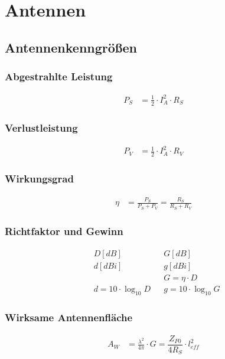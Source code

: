 \section{Antennen}

\subsection{Antennenkenngrößen}



\subsubsection{Abgestrahlte Leistung}
\begin{align*}
    P_S & = \frac{1}{2}\cdot I_A^2 \cdot R_S
\end{align*}

\subsubsection{Verlustleistung}
\begin{align*}
    P_V & = \frac{1}{2}\cdot I_A^2\cdot R_V
\end{align*}

\subsubsection{Wirkungsgrad}
\begin{align*}
    \eta & = \frac{P_S}{P_S + P_V} = \frac{R_S}{R_S + R_V}
\end{align*}

\subsubsection{Richtfaktor und Gewinn}
\begin{align*}
     & D\left[\si{dB}\right]  &  & G\left[\si{dB}\right]  \\
     & d\left[\si{dBi}\right] &  & g\left[\si{dBi}\right] \\
     &                        &  & G  = \eta\cdot D       \\
     & d = 10\cdot\log_{10} D &  & g  = 10\cdot\log_{10}G
\end{align*}

\subsubsection{Wirksame Antennenfläche}
\begin{align*}
    A_W & = \frac{\lambda^2}{4\pi}\cdot G = \dfrac{Z_{F0}}{4 R_S} \cdot l_{eff}^2
\end{align*}


